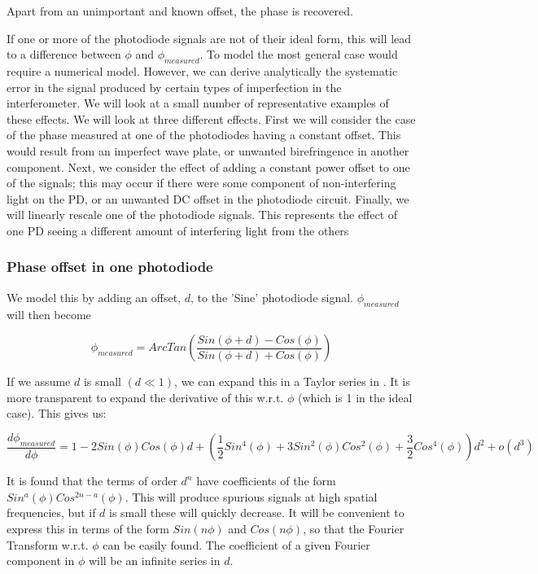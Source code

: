 \documentclass{article}
\begin{document}
Apart from an unimportant and known offset, the phase is recovered.

If one or more of the photodiode signals are not of their ideal form,
this will lead to a difference between $\phi$ and $\phi_{measured}$.
To model the most general case would require a numerical model. However,
we can derive analytically the systematic error in the signal produced
by certain types of imperfection in the interferometer. We will look
at a small number of representative examples of these effects. We
will look at three different effects. First we will consider the case
of the phase measured at one of the photodiodes having a constant
offset. This would result from an imperfect wave plate, or unwanted
birefringence in another component. Next, we consider the effect of
adding a constant power offset to one of the signals; this may occur
if there were some component of non-interfering light on the PD, or
an unwanted DC offset in the photodiode circuit. Finally, we will
linearly rescale one of the photodiode signals. This represents the
effect of one PD seeing a different amount of interfering light from
the others


\subsubsection{Phase offset in one photodiode}

We model this by adding an offset, $d$, to the 'Sine' photodiode
signal. $\phi_{measured}$ will then become

\begin{equation}
\phi_{measured}=ArcTan\left(\frac{Sin\left(\phi+d\right)-Cos\left(\phi\right)}{Sin\left(\phi+d\right)+Cos\left(\phi\right)}\right)
\end{equation}


If we assume $d$ is small $\left(d\ll1\right)$, we can expand this
in a Taylor series in . It is more transparent to expand the derivative
of this w.r.t. $\phi$ (which is 1 in the ideal case). This gives
us:

\begin{equation}
\frac{d\phi_{measured}}{d\phi}=1-2Sin\left(\phi\right)Cos\left(\phi\right)d+\left(\frac{1}{2}Sin^{4}\left(\phi\right)+3Sin^{2}\left(\phi\right)Cos^{2}\left(\phi\right)+\frac{3}{2}Cos^{4}\left(\phi\right)\right)d^{2}+o\left(d^{3}\right)
\end{equation}


It is found that the terms of order $d^{n}$ have coefficients of
the form $Sin^{a}\left(\phi\right)Cos^{2n-a}\left(\phi\right)$.  This
will produce spurious signals at high spatial frequencies, but if
$d$ is small these will quickly decrease. It will be convenient to
express this in terms of the form $Sin\left(n\phi\right)$ and $Cos\left(n\phi\right)$,
so that the Fourier Transform w.r.t. $\phi$ can be easily found.
The coefficient of a given Fourier component in $\phi$ will be an
infinite series in $d$.
\end{document}
